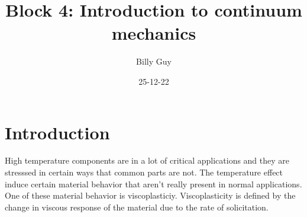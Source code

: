 \documentclass[]{book}
\title{Block 4: Introduction to continuum mechanics}
\author{Billy Guy}
\date{25-12-22}
\begin{document}
\maketitle

\frontmatter






\tableofcontents

\mainmatter

\chapter{Introduction}
High temperature components are in a lot of critical applications and they are stresssed in certain ways that common parts are not. The temperature effect induce certain material behavior that aren't really present in normal applications. One of these material behavior is viscoplasticiy. Viscoplasticity is defined by the change in viscous response of the material due to the rate of solicitation.







\end{document}
